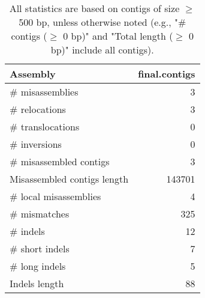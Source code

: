\documentclass[12pt,a4paper]{article}
\begin{document}
\begin{table}[ht]
\begin{center}
\caption{All statistics are based on contigs of size $\geq$ 500 bp, unless otherwise noted (e.g., "\# contigs ($\geq$ 0 bp)" and "Total length ($\geq$ 0 bp)" include all contigs).}
\begin{tabular}{|l*{1}{|r}|}
\hline
Assembly & final.contigs \\ \hline
\# misassemblies & 3 \\ \hline
\hspace{5mm}\# relocations & 3 \\ \hline
\hspace{5mm}\# translocations & 0 \\ \hline
\hspace{5mm}\# inversions & 0 \\ \hline
\# misassembled contigs & 3 \\ \hline
Misassembled contigs length & 143701 \\ \hline
\# local misassemblies & 4 \\ \hline
\# mismatches & 325 \\ \hline
\# indels & 12 \\ \hline
\hspace{5mm}\# short indels & 7 \\ \hline
\hspace{5mm}\# long indels & 5 \\ \hline
Indels length & 88 \\ \hline
\end{tabular}
\end{center}
\end{table}
\end{document}

